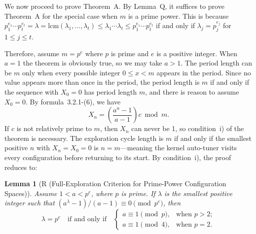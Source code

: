 \documentclass[12pt]{article}
\newtheorem{lemma}[theorem]{Lemma}
\begin{document}
We now proceed to prove Theorem~A. By Lemma~Q, it suffices to prove Theorem~A for the special case when $m$ is a prime power. This is because $p_1^{e_1} \cdots p_t^{e_t} = \lambda = \text{lcm}(\lambda_1, \ldots, \lambda_t) \leq \lambda_1 \cdots \lambda_t \leq p_1^{e_1} \cdots p_t^{e_t}$ if and only if $\lambda_j = p_j^{e_j}$ for $1 \leq j \leq t$.

Therefore, assume $m = p^e$ where $p$ is prime and $e$ is a positive integer. When $a = 1$ the theorem is obviously true, so we may take $a > 1$. The period length can be $m$ only when every possible integer $0 \leq x < m$ appears in the period. Since no value appears more than once in the period, the period length is $m$ if and only if the sequence with $X_0 = 0$ has period length $m$, and there is reason to assume $X_0 = 0$. By formula~3.2.1-(6), we have
\[
X_n = \left(\frac{a^n - 1}{a - 1}\right)c \bmod m.
\]
If $c$ is not relatively prime to $m$, then $X_n$ can never be 1, so condition~i) of the theorem is necessary. The exploration cycle length is $m$ if and only if the smallest positive $n$ with $X_n = X_0 = 0$ is $n = m$---meaning the kernel auto-tuner visits every configuration before returning to its start. By condition~i), the proof reduces to:

\begin{lemma}[R (Full-Exploration Criterion for Prime-Power Configuration Spaces)]
Assume $1 < a < p^e$, where $p$ is prime. If $\lambda$ is the smallest positive integer such that $(a^\lambda - 1)/(a - 1) \equiv 0 \pmod{p^e}$, then
\[
\lambda = p^e \quad \text{if and only if} \quad
\begin{cases}
a \equiv 1 \pmod{p}, & \text{when } p > 2; \\
a \equiv 1 \pmod{4}, & \text{when } p = 2.
\end{cases}
\]
\end{lemma}
\end{document}
